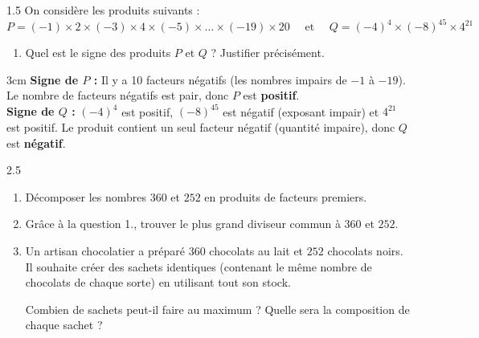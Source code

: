 \documentclass[a4paper]{book}
\begin{document}
{    
    \begin{exerciceNote}{1.5}
        On considère les produits suivants : 
        $$P = (-1) \times 2 \times (-3) \times 4 \times (-5) \times \dots \times (-19) \times 20 
        \quad \text{ et } \quad Q=(-4)^4\times(-8)^{45}\times4^{21}$$
        \begin{enumerate}
            \item Quel est le signe des produits $P$ et $Q$ ? Justifier précisément.
        \end{enumerate}
        
        \begin{ZoneReponse}{3cm}
        \color{blue}
        \textbf{Signe de $P$ :} Il y a 10 facteurs négatifs (les nombres impairs de $-1$ à $-19$). Le nombre de facteurs négatifs est pair, donc $P$ est \textbf{positif}. \\[0.2cm]
        \textbf{Signe de $Q$ :} $(-4)^4$ est positif, $(-8)^{45}$ est négatif (exposant impair) et $4^{21}$ est positif. Le produit contient un seul facteur négatif (quantité impaire), donc $Q$ est \textbf{négatif}.
        \end{ZoneReponse}
    \end{exerciceNote}


\newpage
    
    \begin{exerciceNote}{2.5}
        \begin{enumerate}
            \item Décomposer les nombres $360$ et $252$ en produits de facteurs premiers.
            \item Grâce à la question 1., trouver le plus grand diviseur commun à $360$ et $252$.
            \item Un artisan chocolatier a préparé $360$ chocolats au lait et $252$ chocolats noirs. Il souhaite créer des sachets identiques (contenant le même nombre de chocolats de chaque sorte) en utilisant tout son stock. 
            
            Combien de sachets peut-il faire au maximum ? Quelle sera la composition de chaque sachet ?
        \end{enumerate}
        

\end{exerciceNote}}
\end{document}
